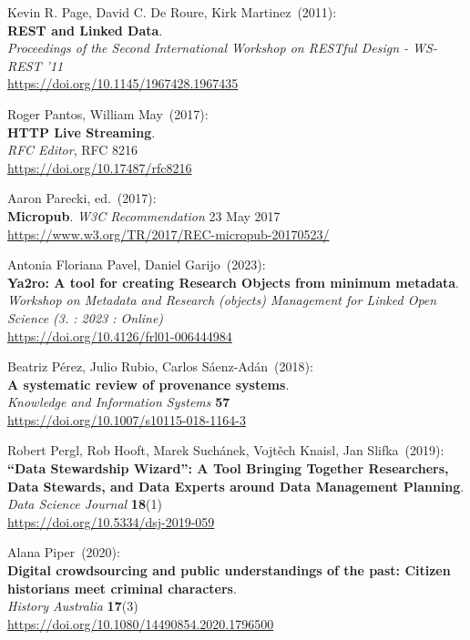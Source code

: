 \begin{thebibliography}{9}
Kevin R. Page, David C. De Roure, Kirk Martinez~(2011): \\
\textbf{{REST} and {Linked Data}}. \\
\emph{Proceedings of the {Second International Workshop} on {RESTful Design} - {WS-REST} '11} \\
\url{https://doi.org/10.1145/1967428.1967435}

Roger Pantos, William May~(2017): \\
\textbf{HTTP Live Streaming}. \\
\emph{RFC Editor}, RFC 8216\\
\url{https://doi.org/10.17487/rfc8216}

Aaron Parecki, ed.~(2017): \\
\textbf{Micropub}. 
\emph{W3C Recommendation} 23 May 2017\\
\url{https://www.w3.org/TR/2017/REC-micropub-20170523/}

Antonia Floriana Pavel, Daniel Garijo~(2023): \\
\textbf{Ya2ro: A tool for creating Research Objects from minimum metadata}.\\
\emph{Workshop on Metadata and Research (objects) Management for Linked Open Science (3. : 2023 : Online)}\\
\url{https://doi.org/10.4126/frl01-006444984}

Beatriz Pérez, Julio Rubio, Carlos Sáenz-Adán~(2018): \\
\textbf{A systematic review of provenance systems}.\\
\emph{Knowledge and Information Systems} \textbf{57}\\
\url{https://doi.org/10.1007/s10115-018-1164-3} 

Robert Pergl, Rob Hooft, Marek Suchánek, Vojtěch Knaisl, Jan Slifka~(2019): \\
\textbf{``Data Stewardship Wizard'': A Tool Bringing Together Researchers, Data Stewards, and Data Experts around Data Management Planning}.\\
\emph{Data Science Journal} \textbf{18}(1)\\
\url{https://doi.org/10.5334/dsj-2019-059}

Alana Piper~(2020): \\
\textbf{Digital crowdsourcing and public understandings of the past: Citizen historians meet criminal characters}.\\
\emph{History Australia} \textbf{17}(3) \\
\url{https://doi.org/10.1080/14490854.2020.1796500}


\end{thebibliography}
